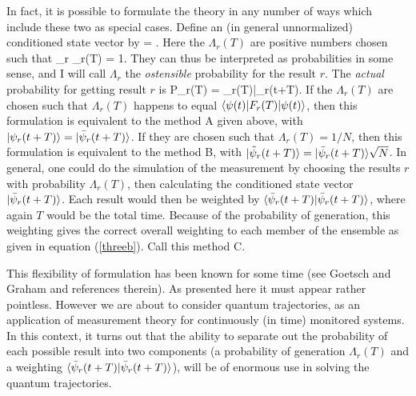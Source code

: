 In fact, it is possible to formulate the theory in any number of ways which
include these two as special cases. Define an (in general unnormalized) conditioned
state vector by
\beq \label{threea}
 =  .
\eeq
Here the $\Lambda_r(T)$ are positive numbers chosen such that
\beq
\sum_r \Lambda_r(T) = 1.
\eeq
They can thus be interpreted as probabilities in some sense, and I will call
$\Lambda_r$ the {\em ostensible} probability for the result $r$. The
{\em actual} probability for getting result $r$ is 
\beq \label{threeb}
P_r(T) = \Lambda_r(T)\bar{\psi}_r(t+T)\rangle.
\eeq
If the $\Lambda_r(T)$ are chosen such that $\Lambda_r(T)$ happens to equal
$\langle {\psi(t)} |F_r(T)| {\psi(t)} \rangle$, then this formulation is equivalent to the
method A given above, with $| {\psi_r(t+T)} \rangle = | {\bar{\psi}_r(t+T)} \rangle$. If they
are chosen such that $\Lambda_r(T) = 1/N$, then this formulation is equivalent to
the method B, with
$| {\tilde\psi_r(t+T)} \rangle=| {\bar\psi_r(t+T)} \rangle\sqrt{N}$.  In general, one could do
the simulation of the measurement 
by choosing the results $r$ with probability $\Lambda_r(T)$, then calculating the
conditioned state vector $| {\bar{\psi}_r(t+T)} \rangle$. Each result would then be
weighted by $\langle {\bar{\psi}_r(t+T)} |\bar{\psi}_r(t+T)\rangle$, where again $T$ would
be the total time. Because of the probability of generation, this weighting gives the
correct overall weighting to each member of the ensemble as given in equation
(\ref{threeb}). Call this method C.

This flexibility of formulation has been known for some time (see Goetsch and
Graham \cite{GoeGra94b} and references therein). As presented here it must appear
rather pointless. However we are about to consider quantum trajectories, as an
application of measurement theory for continuously (in time) monitored systems.
In this context, it turns out that the ability to separate out the probability
of each possible result into two components (a probability of generation
$\Lambda_r(T)$ and a weighting $\langle {\bar{\psi}_r(t+T)} |\bar{\psi}_r(t+T)\rangle$),
will be of enormous use in solving the quantum trajectories. 


